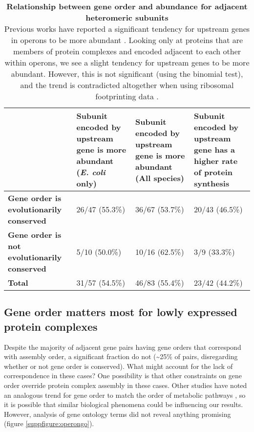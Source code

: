 \documentclass[a4paper,11pt,twoside,openright]{scrbook}
\begin{document}
\begin{table}[h]
    \captionsetup{width=0.9\textwidth}
    \caption[Relationship between gene order and abundance for adjacent heteromeric subunits]{\sffamily \textbf{Relationship between gene order and abundance for adjacent heteromeric subunits} \\ \small Previous works have reported a significant tendency for upstream genes in operons to be more abundant \cite{Nishizaki2007,Lim2011}. Looking only at proteins that are members of protein complexes and encoded adjacent to each other within operons, we see a slight tendency for upstream genes to be more abundant. However, this is not significant (using the binomial test), and the trend is contradicted altogether when using ribosomal footprinting data \cite{Li2014b}.}
    \centering
    \onehalfspacing
    \begin{tabular}{p{30mm} | p{29mm} p{29mm} p{29mm}}
    \hline
    &  \textbf{Subunit encoded by upstream gene is more abundant (\textit{E. coli} only)}  & \textbf{Subunit encoded by upstream gene is more abundant (All species)} &  \textbf{Subunit encoded by upstream gene has a higher rate of protein synthesis}\\[0.1cm]
    \hline
    \raggedright \textbf{Gene order is evolutionarily conserved} & 26/47 (55.3\%) & 36/67 (53.7\%) &  20/43 (46.5\%)\\
    \raggedright \textbf{Gene order is not evolutionarily conserved} & 5/10 (50.0\%) & 10/16 (62.5\%) & 3/9 (33.3\%)\\
    \raggedright \textbf{Total} & 31/57 (54.5\%) & 46/83 (55.4\%) & 23/42 (44.2\%)\\[0.1cm]
    \hline
    \end{tabular}
    \label{table:abundgeneorder}
\end{table}


\subsection{Gene order matters most for lowly expressed protein complexes}
Despite the majority of adjacent gene pairs having gene orders that correspond with assembly order, a significant fraction do not (\textasciitilde 25\% of pairs, disregarding whether or not gene order is conserved). What might account for the lack of correspondence in these cases? One possibility is that other constraints on gene order override protein complex assembly in these cases. Other studies have noted an analogous trend for gene order to match the order of metabolic pathways \cite{Zaslaver2004,Kovacs2009}, so it is possible that similar biological phenomena could be influencing our results. However, analysis of gene ontology terms \cite{Huntley2015} did not reveal anything promising (figure \ref{suppfigure:operongo}).
\end{document}
